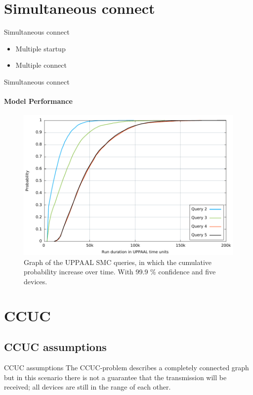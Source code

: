 \section{Simultaneous connect}
\begin{frame}{Simultaneous connect}
  \begin{itemize}
    \item Multiple startup
    \item Multiple connect
  \end{itemize}
\end{frame}

\begin{frame}{Simultaneous connect}
\framesubtitle{Model Performance}
  \begin{figure}[ht]
  \includegraphics[width=1\textwidth]{images/graph.pdf} 
\caption{Graph of the UPPAAL SMC queries, in which the cumulative probability increase over time. With 99.9 \% confidence and five devices.}
\label{fig:ConnectQueryTime}
\end{figure}
\end{frame}

\section{CCUC}
\subsection{CCUC assumptions}
\begin{frame}{CCUC assumptions}
The CCUC-problem describes a completely connected graph but in this scenario there is not a guarantee that the transmission will be received; all devices are still in the range of each other.
\end{frame}

